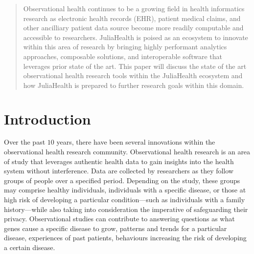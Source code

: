 \documentclass{juliacon}
\begin{document}


\maketitle

\begin{abstract}

Observational health continues to be a growing field in health informatics research as electronic health records (EHR), patient medical claims, and other ancilliary patient data source become more readily computable and accessible to researchers.
JuliaHealth is poised as an ecosystem to innovate within this area of research by bringing highly performant analytics approaches, composable solutions, and interoperable software that leverages prior state of the art. 
This paper will discuss the state of the art observational health research tools within the JuliaHealth ecosystem and how JuliaHealth is prepared to further research goals within this domain.

\end{abstract}

\section{Introduction}

Over the past $10$ years, there have been several innovations within the observational health research community.  Observational health research is an area of study that leverages authentic health data to gain insights into the health system without interference. Data are collected by researchers as they follow groups of people over a specified period. Depending on the study, these groups may comprise healthy individuals, individuals with a specific disease, or those at high risk of developing a particular condition—such as individuals with a family history—while also taking into consideration the imperative of safeguarding their privacy. Observational studies can contribute to answering questions as what genes cause a specific disease to grow, patterns and trends for a particular disease, experiences of past patients, behaviours increasing the risk of developing a certain disease. 

 
\end{document}
